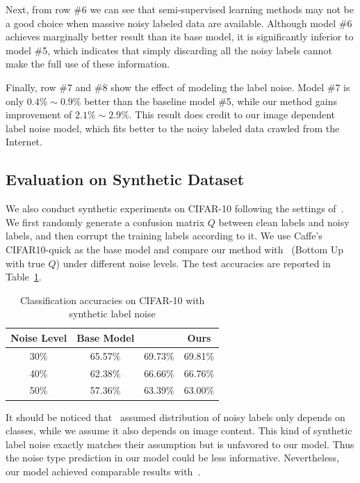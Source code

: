 \documentclass[10pt,twocolumn,letterpaper]{article}
\begin{document}
Next, from row \#6 we can see that semi-supervised learning methods may not be a good choice when massive noisy labeled data are available. Although model \#6 achieves marginally better result than its base model, it is significantly inferior to model \#5, which indicates that simply discarding all the noisy labels cannot make the full use of these information.

Finally, row \#7 and \#8 show the effect of modeling the label noise. Model \#7 is only $0.4\% \sim 0.9\%$ better than the baseline model \#5, while our method gains improvement of $2.1\% \sim 2.9\%$. This result does credit to our image dependent label noise model, which fits better to the noisy labeled data crawled from the Internet.

\subsection{Evaluation on Synthetic Dataset} %
\label{sub:evaluation_on_synthetic_dataset}
We also conduct synthetic experiments on CIFAR-10 following the settings of~\cite{sukhbaatar2014learning}. We first randomly generate a confusion matrix $Q$ between clean labels and noisy labels, and then corrupt the training labels according to it. We use Caffe's CIFAR10-quick as the base model and compare our method with~\cite{sukhbaatar2014learning} (Bottom Up with true $Q$) under different noise levels. The test accuracies are reported in Table~\ref{tab:accuracy_synthetic}.

\begin{table}
\begin{center}
\begin{tabular}{c|c|c|c}
\hline
Noise Level & Base Model & \cite{sukhbaatar2014learning} & Ours \\
\hline\hline
30\% & 65.57\% & 69.73\% & 69.81\% \\
\hline
40\% & 62.38\% & 66.66\% & 66.76\% \\
\hline
50\% & 57.36\% & 63.39\% & 63.00\% \\
\hline
\end{tabular}
\end{center}
\caption{Classification accuracies on CIFAR-10 with synthetic label noise}
\label{tab:accuracy_synthetic}
\end{table}

It should be noticed that~\cite{sukhbaatar2014learning} assumed distribution of noisy labels only depends on classes, while we assume it also depends on image content. This kind of synthetic label noise exactly matches their assumption but is unfavored to our model. Thus the noise type prediction in our model could be less informative. Nevertheless, our model achieved comparable results with~\cite{sukhbaatar2014learning}.
\end{document}
